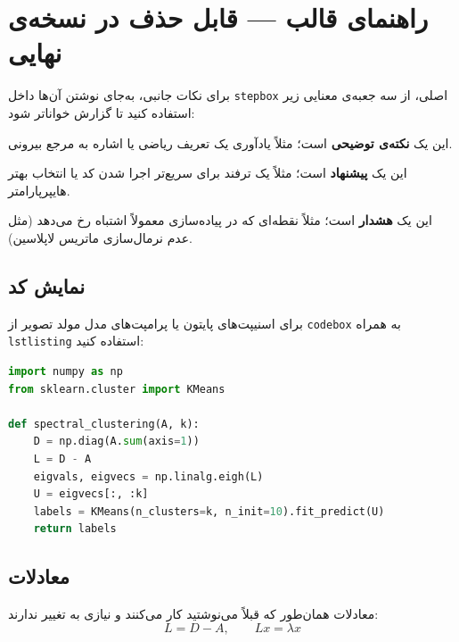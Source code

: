 \section{راهنمای قالب  — قابل حذف در نسخه‌ی نهایی}

\begin{stepbox}
\end{stepbox}

\vspace{0.5cm}
\noindent برای نکات جانبی، به‌جای نوشتن آن‌ها داخل \texttt{stepbox} اصلی، از سه جعبه‌ی معنایی زیر استفاده کنید تا گزارش خواناتر شود:

\begin{notebox}
این یک \textbf{نکته‌ی توضیحی} است؛ مثلاً یادآوری یک تعریف ریاضی یا اشاره به مرجع بیرونی.
\end{notebox}

\begin{tipbox}
این یک \textbf{پیشنهاد} است؛ مثلاً یک ترفند برای سریع‌تر اجرا شدن کد یا انتخاب بهتر هایپرپارامتر.
\end{tipbox}

\begin{warnbox}
این یک \textbf{هشدار} است؛ مثلاً نقطه‌ای که در پیاده‌سازی معمولاً اشتباه رخ می‌دهد (مثل عدم نرمال‌سازی ماتریس لاپلاسین).
\end{warnbox}

\subsection{نمایش کد}
برای اسنیپت‌های پایتون یا پرامپت‌های مدل مولد تصویر از \texttt{codebox} به همراه \texttt{lstlisting} استفاده کنید:

\begin{codebox}
\begin{lstlisting}[language=Python]
import numpy as np
from sklearn.cluster import KMeans

def spectral_clustering(A, k):
    D = np.diag(A.sum(axis=1))
    L = D - A
    eigvals, eigvecs = np.linalg.eigh(L)
    U = eigvecs[:, :k]
    labels = KMeans(n_clusters=k, n_init=10).fit_predict(U)
    return labels
\end{lstlisting}
\end{codebox}

\subsection{معادلات}
معادلات همان‌طور که قبلاً می‌نوشتید کار می‌کنند و نیازی به تغییر ندارند:
\[
L = D - A, \qquad Lx = \lambda x
\]

